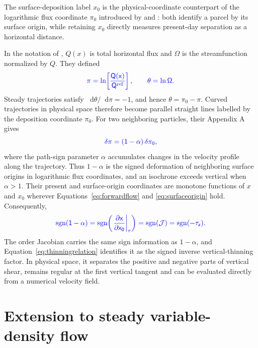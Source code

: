 \documentclass[review]{igs}
\providecommand{\DIFadd}[1]{{\protect\color{blue} \sf #1}} %
\providecommand{\DIFaddbegin}{} %
\providecommand{\DIFaddend}{} %
\newcommand{\DIFaddincludegraphics}[2][]{{\color{blue}\fbox{\DIFOincludegraphics[#1]{#2}}}} %
\DeclareRobustCommand{\DIFaddbegin}{\DIFOaddbegin \let\includegraphics\DIFaddincludegraphics} %
\DeclareRobustCommand{\DIFaddend}{\DIFOaddend \let\includegraphics\DIFOincludegraphics} %
\begin{document}
\DIFadd{The surface-deposition label \(x_0\) is the physical-coordinate counterpart of the logarithmic flux coordinate \(\pi_0\) introduced by \citet{ParreninHindmarshRemy2006} and \citet{ParreninHindmarsh2007}: both identify a parcel by its surface origin, while retaining \(x_0\) directly measures present-day separation as a horizontal distance.
}

\DIFadd{In the notation of \citet{ParreninHindmarsh2007}, \(Q(x)\) is total horizontal flux and \(\Omega\) is the streamfunction normalized by \(Q\). They defined
}\begin{equation}
\DIFadd{\pi=\ln\!\left[\frac{Q(x)}{Q^{\mathrm{ref}}}\right],
\qquad
\theta=\ln\Omega.
}\end{equation}
\DIFadd{Steady trajectories satisfy \(\mathop{}\!\mathrm{d}\theta/\mathop{}\!\mathrm{d}\pi=-1\), and hence \(\theta=\pi_0-\pi\). Curved trajectories in physical space therefore become parallel straight lines labelled by the deposition coordinate \(\pi_0\). For two neighboring particles, their Appendix A gives
}\begin{equation}
\DIFadd{\delta\pi=(1-\alpha)\,\delta\pi_0,
}\end{equation}
\DIFadd{where the path-sign parameter \(\alpha\) accumulates changes in the velocity profile along the trajectory. Thus \(1-\alpha\) is the signed deformation of neighboring surface origins in logarithmic flux coordinates, and an isochrone exceeds vertical when \(\alpha>1\). Their present and surface-origin coordinates are monotone functions of \(x\) and \(x_0\) wherever Equations~\ref{eq:forwardflow} and \ref{eq:surfaceorigin} hold. Consequently,
}\begin{equation}
\DIFadd{\operatorname{sgn}(1-\alpha)
=\operatorname{sgn}\!\left(
\left.\frac{\partial x}{\partial x_0}\right|_{\tau}
\right)
=\operatorname{sgn}(\mathcal{J})
=\operatorname{sgn}(-\tau_z).
\label{eq:PHsign}
}\end{equation}
\DIFadd{The order Jacobian carries the same sign information as \(1-\alpha\), and Equation~\ref{eq:thinningrelation} identifies it as the signed inverse vertical-thinning factor. In physical space, it separates the positive and negative parts of vertical shear, remains regular at the first vertical tangent and can be evaluated directly from a numerical velocity field.
}

\DIFaddend \section{Extension to steady variable-density flow}
\DIFaddbegin \label{app:density}
\DIFaddend 
\end{document}
